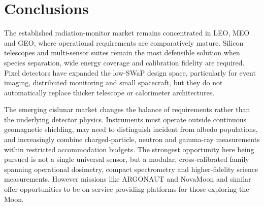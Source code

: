 \chapter{Conclusions}
The established radiation-monitor market remains concentrated in LEO, MEO and GEO, where operational requirements are comparatively mature. Silicon telescopes and multi-sensor suites remain the most defensible solution when species separation, wide energy coverage and calibration fidelity are required. Pixel detectors have expanded the low-SWaP design space, particularly for event imaging, distributed monitoring and small spacecraft, but they do not automatically replace thicker telescope or calorimeter architectures.

The emerging cislunar market changes the balance of requirements rather than the underlying detector physics. Instruments must operate outside continuous geomagnetic shielding, may need to distinguish incident from albedo populations, and increasingly combine charged-particle, neutron and gamma-ray measurements within restricted accommodation budgets. The strongest opportunity here being pursued is not a single universal sensor, but a modular, cross-calibrated family spanning operational dosimetry, compact spectrometry and higher-fidelity science measurements. However missions like ARGONAUT and NovaMoon and similar offer opportunities to be on service providing platforms for those exploring the Moon.

